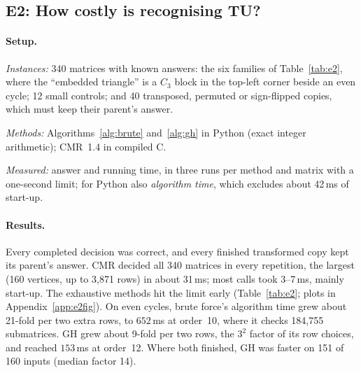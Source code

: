 \subsection{E2: How costly is recognising TU?}\label{sec:e2}

\paragraph{Setup.}
\begin{setup}
  \item \emph{Instances:} 340 matrices with known answers: the six families of Table~\ref{tab:e2}, where the ``embedded triangle'' is a $C_3$ block in the top-left corner beside an even cycle; 12 small controls; and 40 transposed, permuted or sign-flipped copies, which must keep their parent's answer.
  \item \emph{Methods:} Algorithms~\ref{alg:brute} and~\ref{alg:gh} in Python (exact integer arithmetic); CMR~1.4 in compiled C.
  \item \emph{Measured:} answer and running time, in three runs per method and matrix with a one-second limit; for Python also \emph{algorithm time}, which excludes about 42\,ms of start-up.
\end{setup}

\paragraph{Results.} Every completed decision was correct, and every finished transformed copy kept its parent's answer. CMR decided all 340 matrices in every repetition, the largest (160 vertices, up to 3,871 rows) in about 31\,ms; most calls took 3--7\,ms, mainly start-up. The exhaustive methods hit the limit early (Table~\ref{tab:e2}; plots in Appendix~\ref{app:e2fig}). On even cycles, brute force's algorithm time grew about 21-fold per two extra rows, to $652$\,ms at order~10, where it checks 184,755 submatrices. GH grew about 9-fold per two rows, the $3^2$ factor of its row choices, and reached $153$\,ms at order~12. Where both finished, GH was faster on 151 of 160 inputs (median factor 14).

